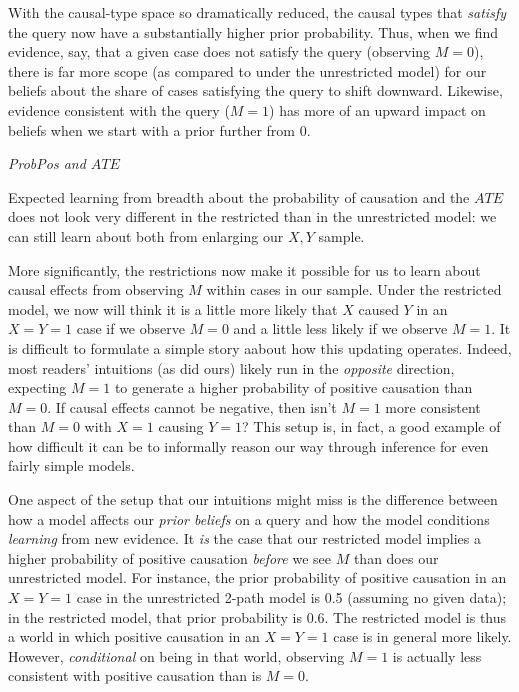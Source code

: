 \documentclass[
  12pt,
]{book}
\begin{document}
With the causal-type space so dramatically reduced, the causal types that \emph{satisfy} the query now have a substantially higher prior probability. Thus, when we find evidence, say, that a given case does not satisfy the query (observing \(M=0\)), there is far more scope (as compared to under the unrestricted model) for our beliefs about the share of cases satisfying the query to shift downward. Likewise, evidence consistent with the query (\(M=1\)) has more of an upward impact on beliefs when we start with a prior further from 0.

\emph{ProbPos and \(ATE\)}

Expected learning from breadth about the probability of causation and the \(ATE\) does not look very different in the restricted than in the unrestricted model: we can still learn about both from enlarging our \(X, Y\) sample.

More significantly, the restrictions now make it possible for us to learn about causal effects from observing \(M\) within cases in our sample. Under the restricted model, we now will think it is a little more likely that \(X\) caused \(Y\) in an \(X=Y=1\) case if we observe \(M=0\) and a little less likely if we observe \(M=1\). It is difficult to formulate a simple story aabout how this updating operates. Indeed, most readers' intuitions (as did ours) likely run in the \emph{opposite} direction, expecting \(M=1\) to generate a higher probability of positive causation than \(M=0\). If causal effects cannot be negative, then isn't \(M=1\) more consistent than \(M=0\) with \(X=1\) causing \(Y=1\)? This setup is, in fact, a good example of how difficult it can be to informally reason our way through inference for even fairly simple models.

One aspect of the setup that our intuitions might miss is the difference between how a model affects our \emph{prior beliefs} on a query and how the model conditions \emph{learning} from new evidence. It \emph{is} the case that our restricted model implies a higher probability of positive causation \emph{before} we see \(M\) than does our unrestricted model. For instance, the prior probability of positive causation in an \(X=Y=1\) case in the unrestricted 2-path model is 0.5 (assuming no given data); in the restricted model, that prior probability is 0.6. The restricted model is thus a world in which positive causation in an \(X=Y=1\) case is in general more likely. However, \emph{conditional} on being in that world, observing \(M=1\) is actually less consistent with positive causation than is \(M=0\).
\end{document}

